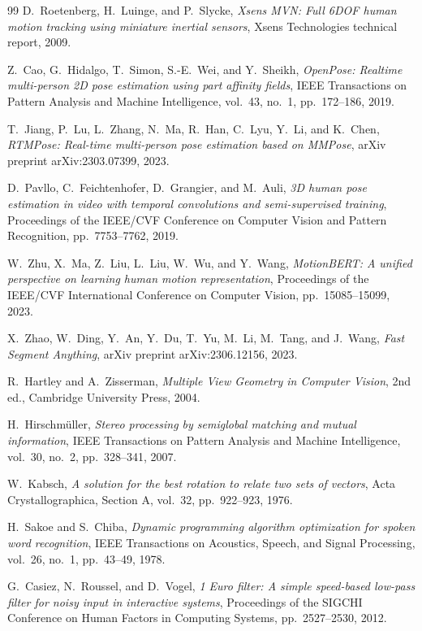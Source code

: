 \documentclass[12pt,a4paper]{article}
\begin{document}
\begin{thebibliography}{99}
D.~Roetenberg, H.~Luinge, and P.~Slycke,
\textit{Xsens MVN: Full 6DOF human motion tracking using miniature inertial sensors},
Xsens Technologies technical report, 2009.

Z.~Cao, G.~Hidalgo, T.~Simon, S.-E.~Wei, and Y.~Sheikh,
\textit{OpenPose: Realtime multi-person 2D pose estimation using part affinity fields},
IEEE Transactions on Pattern Analysis and Machine Intelligence,
vol.~43, no.~1, pp.~172--186, 2019.

T.~Jiang, P.~Lu, L.~Zhang, N.~Ma, R.~Han, C.~Lyu, Y.~Li, and K.~Chen,
\textit{RTMPose: Real-time multi-person pose estimation based on MMPose},
arXiv preprint arXiv:2303.07399, 2023.

D.~Pavllo, C.~Feichtenhofer, D.~Grangier, and M.~Auli,
\textit{3D human pose estimation in video with temporal convolutions and semi-supervised training},
Proceedings of the IEEE/CVF Conference on Computer Vision and Pattern Recognition, pp.~7753--7762, 2019.

W.~Zhu, X.~Ma, Z.~Liu, L.~Liu, W.~Wu, and Y.~Wang,
\textit{MotionBERT: A unified perspective on learning human motion representation},
Proceedings of the IEEE/CVF International Conference on Computer Vision, pp.~15085--15099, 2023.

X.~Zhao, W.~Ding, Y.~An, Y.~Du, T.~Yu, M.~Li, M.~Tang, and J.~Wang,
\textit{Fast Segment Anything},
arXiv preprint arXiv:2306.12156, 2023.

R.~Hartley and A.~Zisserman,
\textit{Multiple View Geometry in Computer Vision},
2nd ed., Cambridge University Press, 2004.

H.~Hirschm{\"u}ller,
\textit{Stereo processing by semiglobal matching and mutual information},
IEEE Transactions on Pattern Analysis and Machine Intelligence,
vol.~30, no.~2, pp.~328--341, 2007.

W.~Kabsch,
\textit{A solution for the best rotation to relate two sets of vectors},
Acta Crystallographica, Section A, vol.~32, pp.~922--923, 1976.

H.~Sakoe and S.~Chiba,
\textit{Dynamic programming algorithm optimization for spoken word recognition},
IEEE Transactions on Acoustics, Speech, and Signal Processing,
vol.~26, no.~1, pp.~43--49, 1978.

G.~Casiez, N.~Roussel, and D.~Vogel,
\textit{1 Euro filter: A simple speed-based low-pass filter for noisy input in interactive systems},
Proceedings of the SIGCHI Conference on Human Factors in Computing Systems, pp.~2527--2530, 2012.

\end{thebibliography}
\end{document}
